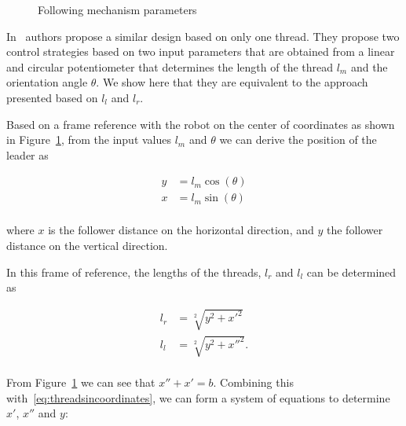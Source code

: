 \documentclass[journal]{IEEEtran}
\begin{document}
\begin{figure}[]
\begin{tikzpicture}[x=0.75pt,y=0.75pt,yscale=-1,xscale=1]
\end{tikzpicture}
\label{fig:dibujito}
\caption{Following mechanism parameters}
\end{figure}


In~\cite{Endo2015} authors propose a similar design based on only one thread.  They propose two control strategies based on two input parameters that are obtained from a linear and circular potentiometer that determines the length of the thread $l_m$ and the orientation angle $\theta$.  We show here that they are equivalent to the approach presented based on $l_l$ and  $l_r$.

Based on a frame reference with the robot on the center of coordinates as shown in Figure~\ref{fig:dibujito}, from the input values $l_m$ and $\theta$ we can derive the position of the leader as

\begin{align*}
   y &= l_m  \cos(\theta)\\
   x &= l_m  \sin(\theta) \\
\end{align*}

%
%

\noindent where $x$ is the follower distance on the horizontal direction, and $y$ the follower distance on the vertical direction.

In this frame of reference, the lengths of the threads, $l_r$ and $l_l$ can be determined as

\begin{equation}
\begin{array}{ll}  
l_r &= \sqrt[2]{y^2 + {x'}^2} \\
l_l &= \sqrt[2]{y^2 + {x''}^2}. \\
\end{array}
\label{eq:threadsincoordinates}
\end{equation}

From Figure~\ref{fig:dibujito} we can see that ${x''} + x' =  b$. Combining this with~\ref{eq:threadsincoordinates}, we can form a system of equations to determine $x'$, $x''$ and $y$:
\end{document}
